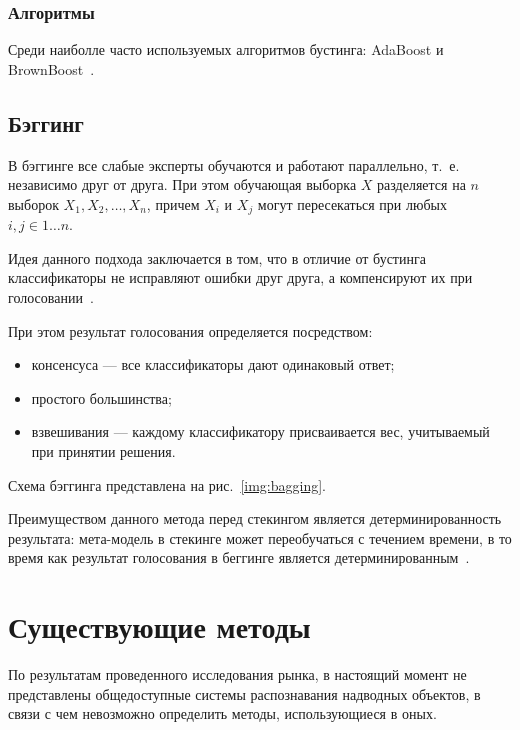 \subsubsection*{Алгоритмы}

Среди наиболле часто используемых алгоритмов бустинга: AdaBoost и BrownBoost~\cite{ensembles}.

\subsection{Бэггинг}

В бэггинге все слабые эксперты обучаются и работают параллельно, т.~е. независимо друг от друга. При этом обучающая выборка $X$ разделяется на $n$ выборок $X_1, X_2, \dots, X_n$, причем $X_i$ и $X_j$ могут пересекаться при любых $i,j \in 1 \dots n$.

Идея данного подхода заключается в том, что в отличие от бустинга классификаторы не исправляют ошибки друг друга, а компенсируют их при голосовании~\cite{ensembles}. 

При этом результат голосования определяется посредством:
\begin{itemize}[label=---]
    \item консенсуса --- все классификаторы дают одинаковый ответ;
    \item простого большинства;
    \item взвешивания --- каждому классификатору присваивается вес, учитываемый при принятии решения.
\end{itemize}

Схема бэггинга представлена на рис.~\ref{img:bagging}.


Преимуществом данного метода перед стекингом является детерминированность результата: мета-модель в стекинге может переобучаться с течением времени, в то время как результат голосования в беггинге является детерминированным~\cite{ensembles}.

\section{Существующие методы}

По результатам проведенного исследования рынка, в настоящий момент не представлены общедоступные системы распознавания надводных объектов, в связи с чем невозможно определить методы, использующиеся в оных. 

